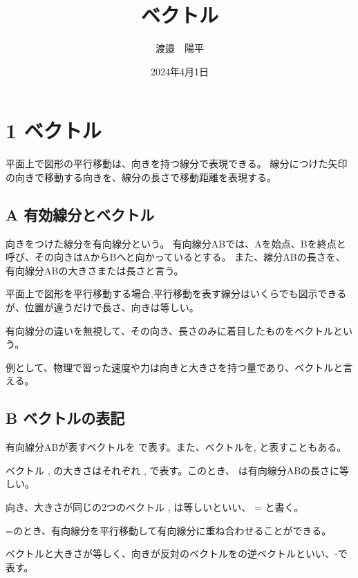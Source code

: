 \documentclass[pulatex,dvpdfmx,a4paper]{jsarticle}
\title{ベクトル}
\author{渡邉　陽平}
\date{2024年4月1日}
\newcommand{\abs}[1]{\lvert #1 \rvert}
\begin{document}
\maketitle

\section*{1 ベクトル}

平面上で図形の平行移動は、向きを持つ線分で表現できる。
線分につけた矢印の向きで移動する向きを、線分の長さで移動距離を表現する。

\subsection*{A 有効線分とベクトル}

向きをつけた線分を有向線分という。
有向線分ABでは、Aを始点、Bを終点と呼び、その向きはAからBへと向かっているとする。
また、線分ABの長さを、有向線分ABの大きさまたは長さと言う。

平面上で図形を平行移動する場合,平行移動を表す線分はいくらでも図示できるが、位置が違うだけで長さ、向きは等しい。

有向線分の違いを無視して、その向き、長さのみに着目したものをベクトルという。

例として、物理で習った速度や力は向きと大きさを持つ量であり、ベクトルと言える。

\subsection*{B ベクトルの表記}
有向線分ABが表すベクトルを で表す。また、ベクトルを,  と表すこともある。
\par ベクトル ,  の大きさはそれぞれ\abs{} , \abs{} で表す。このとき、\abs{} は有向線分ABの長さに等しい。
\par 向き、大きさが同じの2つのベクトル , は等しいといい、 = と書く。
\par{}=のとき、有向線分を平行移動して有向線分に重ね合わせることができる。

\par
ベクトルと大きさが等しく、向きが反対のベクトルをの逆ベクトルといい、-で表す。
\end{document}
